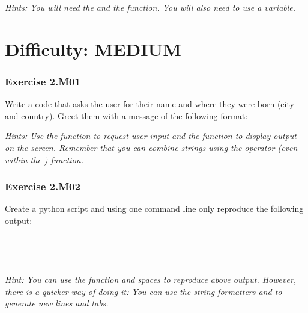 \textit{Hints:
You will need the {} and the {} function. You will also need to use a variable.}\\[1cm]



\newpage
\section{Difficulty: MEDIUM}


\subsubsection*{Exercise 2.M01}
Write a code that asks the user for their name and where they were born (city and country).
Greet them with a message of the following format:\\
\begin{center}
\end{center}


\textit{Hints:
Use the {} function to request user input and the {} function to display output on the screen. Remember that you can combine strings using the {\code{+}} operator (even within the {}) function.}\\[1cm]




\subsubsection*{Exercise 2.M02}
Create a python script and using one command line only reproduce the following output:\\


\\
\\
\\
\\


\textit{Hint:
You can use the {} function and spaces to reproduce above output. However, there is a quicker way of doing it: You can use the string formatters {} and {} to generate new lines and tabs.}\\[1cm]


